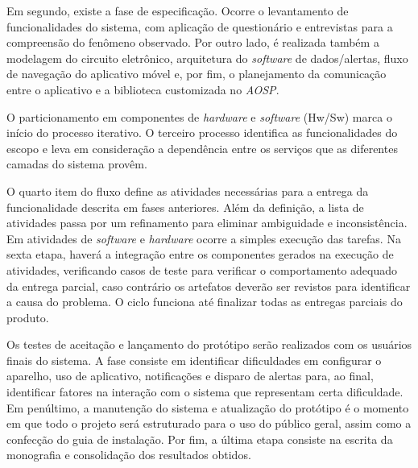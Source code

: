 Em segundo, existe a fase de especificação. Ocorre o levantamento de funcionalidades do sistema, com aplicação de questionário e entrevistas para a compreensão do fenômeno observado. Por outro lado, é realizada também a modelagem do circuito eletrônico, arquitetura do \textit{software} de dados/alertas, fluxo de navegação do aplicativo móvel e, por fim, o planejamento da comunicação entre o aplicativo e a biblioteca customizada no \textit{AOSP}. 

O particionamento em componentes de \textit{hardware} e \textit{software} (Hw/Sw) marca o início do processo iterativo. O terceiro processo identifica as funcionalidades do escopo e leva em consideração a dependência entre os serviços que as diferentes camadas do sistema provêm.

O quarto item do fluxo define as atividades necessárias para a entrega da funcionalidade descrita em fases anteriores. Além da definição, a lista de atividades passa por um refinamento para eliminar ambiguidade e inconsistência. Em atividades de \textit{software} e \textit{hardware} ocorre a simples execução das tarefas. Na sexta etapa, haverá a integração entre os componentes gerados na execução de atividades, verificando casos de teste para verificar o comportamento adequado da entrega parcial, caso contrário os artefatos deverão ser revistos para identificar a causa do problema. O ciclo funciona até finalizar todas as entregas parciais do produto.

Os testes de aceitação e lançamento do protótipo serão realizados com os usuários finais do sistema. A fase consiste em identificar dificuldades em configurar o aparelho, uso de aplicativo, notificações e disparo de alertas para, ao final, identificar fatores na interação com o sistema que representam certa dificuldade. Em penúltimo, a manutenção do sistema e atualização do protótipo é o momento em que todo o projeto será estruturado para o uso do público geral, assim como a confecção do guia de instalação. Por fim, a última etapa consiste na escrita da monografia e consolidação dos resultados obtidos.